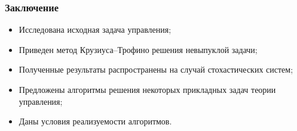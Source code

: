 \documentclass[ignorenonframetext,hyperref={pdftex,unicode},compress,handout]{beamer}
\begin{document}
\begin{frame}
    \frametitle{Заключение}
    \begin{itemize}
        \item Исследована исходная задача управления;
        \item Приведен метод Крузиуса--Трофино решения невыпуклой задачи;
        \item Полученные результаты распространены на случай стохастических систем;
        \item Предложены алгоритмы решения некоторых прикладных задач теории управления;
        \item Даны условия реализуемости алгоритмов.
    \end{itemize}
\end{frame}
\end{document}

